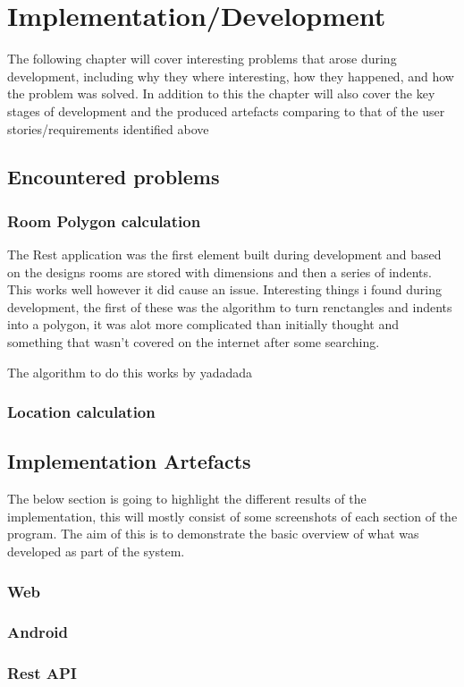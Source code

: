 \section{Implementation/Development}
The following chapter will cover interesting problems that arose during development, including why they where interesting, how they happened, and how the problem was solved. In addition to this the chapter will also cover the key stages of development and the produced artefacts comparing to that of the user stories/requirements identified above

\subsection{Encountered problems} %
\subsubsection{Room Polygon calculation}
The Rest application was the first element built during development and based on the designs rooms are stored with dimensions and then a series of indents. This works well however it did cause an issue.
Interesting things i found during development, the first of these was the algorithm to turn renctangles and indents into a polygon, it was alot more complicated than initially thought and something that wasn't covered on the internet after some searching.

The algorithm to do this works by yadadada

\subsubsection{Location calculation}
\subsection{Implementation Artefacts}
The below section is going to highlight the different results of the implementation, this will mostly consist of some screenshots of each section of the program. The aim of this is to demonstrate the basic overview of what was developed as part of the system.

\subsubsection{Web}
\subsubsection{Android}
\subsubsection{Rest API}


